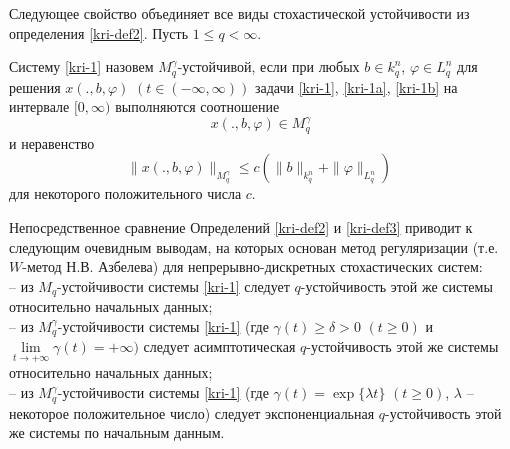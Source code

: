 Следующее свойство объединяет все виды стохастической устойчивости
из определения \ref{kri-def2}. Пусть $1\le q <\infty$.

\begin{definition}\label{kri-def3}  Систему \eqref{kri-1} назовем  $M_q^\gamma
 $-устойчивой, если при любых $b \in k^n_q$, $\varphi \in L^n_q$ для
 решения $x(., b, \varphi)$ $(t \in (-\infty , \infty ))$ задачи \eqref{kri-1}, \eqref{kri-1a},
 \eqref{kri-1b}  на интервале
 $[0,\infty)$ выполняются соотношение $$x(., b, \varphi) \in M_q^\gamma$$ и
 неравенство
 $$
 \|x(., b, \varphi)\|_{M_q^\gamma} \le c\left(\|b\|_{k^n_q} +
 \|\varphi \|_{L^n_q}\right) \
 $$
 для некоторого положительного числа $c$.
\end{definition}

 Непосредственное сравнение Определений \ref{kri-def2} и \ref{kri-def3} приводит к следующим очевидным выводам,
 на которых основан метод регуляризации (т.е. $W$-метод Н.В. Азбелева) для непрерывно-дискретных стохастических систем:\\
\noindent
  -- из  $M_q$-устойчивости системы \eqref{kri-1}
 следует $q$-устойчивость этой же системы относительно
 начальных
 данных;\\
  -- из $M_q^\gamma $-устойчивости системы \eqref{kri-1}
 (где $\gamma (t) \ge \delta > 0$ $(t \ge 0)$ и $\lim \limits
 _{t
 \rightarrow +\infty } \gamma (t) = +\infty )$ следует
 асимптотическая $q$-устойчивость этой же системы
 относительно
 начальных данных;\\
  -- из $M_q^\gamma $-устойчивости системы \eqref{kri-1}
 (где $\gamma (t) = \exp \{\lambda t\}$ $(t \geq 0)$, $\lambda$ --
 некоторое
 положительное число) следует экспоненциальная
 $q$-устойчивость
 этой же системы по начальным данным.



